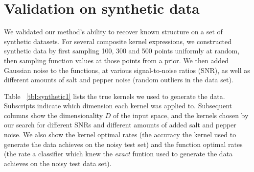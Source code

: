 \documentclass[twoside]{article}
\begin{document}
\section{Validation on synthetic data}

We validated our method's ability to recover known structure on a set of synthetic datasets.
For several composite kernel expressions, we constructed synthetic data by first sampling 100, 300 and 500 points uniformly at random, then sampling function values at those points from a \gp{} prior.
We then added \iid Gaussian noise to the functions, at various signal-to-noise ratios (SNR), as well as different amounts of salt and pepper noise (random outliers in the data set). 

Table ~\ref{tbl:synthetic1}  lists the true kernels we used to generate the data.  Subscripts indicate which dimension each kernel was applied to.  Subsequent columns show the dimensionality $D$ of the input space, and the kernels chosen by our search for different SNRs and different amounts of added salt and pepper noise. 
We also show the kernel optimal rates (the accuracy the kernel used to generate the data achieves on the noisy test set) and the function optimal rates (the rate a classifier which knew the \emph{exact} funtion used to generate the data achieves on the noisy test data set). 
\end{document}

